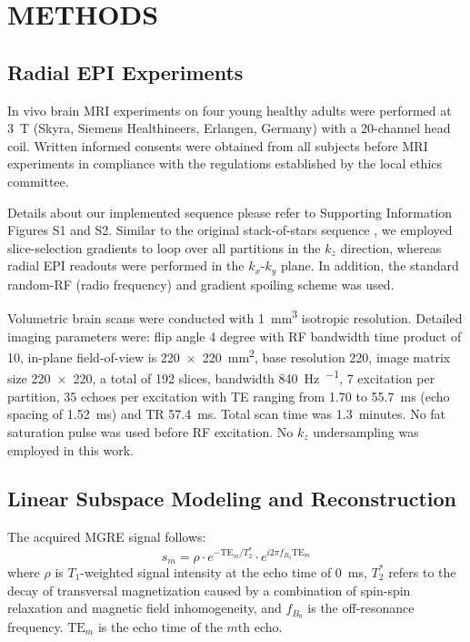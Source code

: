 \documentclass[a4paper,11pt]{article}
\begin{document}
\section{METHODS}

\subsection*{Radial EPI Experiments}

In vivo brain MRI experiments on four young healthy adults were performed at \SI{3}{\tesla}
(Skyra, Siemens Healthineers, Erlangen, Germany) with a 20-channel head coil.
Written informed consents were obtained from all subjects before MRI experiments 
in compliance with the regulations established by the local ethics committee.

Details about our implemented sequence please refer to 
Supporting Information Figures S1 and S2. 
Similar to the original stack-of-stars sequence \cite{block_2014_rad}, 
we employed slice-selection gradients to loop over all partitions in the $k_z$ direction, 
whereas radial EPI readouts were performed in the $k_x$-$k_y$ plane.
In addition, the standard random-RF (radio frequency) 
and gradient spoiling scheme was used.

Volumetric brain scans were conducted with 1~\si{\cubic\mm} isotropic resolution.
Detailed imaging parameters were: 
flip angle 4 degree with RF bandwidth time product of 10, 
in-plane field-of-view is 220~$\times$~220~\si{\square\mm}, 
base resolution 220, image matrix size 220~$\times$~220, 
a total of 192 slices, bandwidth 840~\si{\Hz \per \pixel}, 
7 excitation per partition, 
35 echoes per excitation with TE ranging from 1.70 to 55.7~ms 
(echo spacing of 1.52~\si{\ms}) and TR 57.4~ms. 
Total scan time was 1.3~minutes. 
No fat saturation pulse was used before RF excitation.
No $k_z$ undersampling \cite{feng_2016_vdGRASP} was employed in this work. 


\subsection*{Linear Subspace Modeling and Reconstruction}

The acquired MGRE signal follows:
\begin{equation}
	s_m = \rho \cdot e^{- \text{TE}_m / T_2^*} \cdot e^{i 2\pi f_{B_0} \text{TE}_m}
	\label{EQU:mgre_signal}
\end{equation}
where $\rho$ is $T_1$-weighted signal intensity at the echo time of \SI{0}{ms},
$T_2^*$ refers to the decay of transversal magnetization caused by 
a combination of spin-spin relaxation and magnetic field inhomogeneity, 
and $f_{B_0}$ is the off-resonance frequency. 
$\text{TE}_m$ is the echo time of the $m$th echo.
\end{document}
